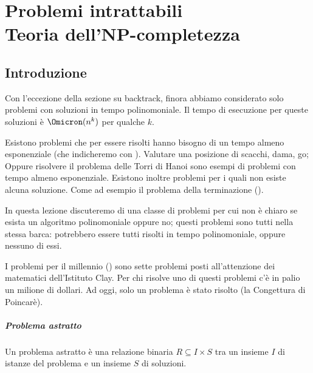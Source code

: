 
\ifsubfile
\usepackage{../settings/subfile}
\setcounter{chapter}{18}


\fi
\chapter[Problemi intrattabili e Teoria dell'NP-completezza]{Problemi intrattabili\\Teoria dell'NP-completezza}

\section*{Introduzione}

Con l'eccezione della sezione su backtrack, finora abbiamo considerato solo problemi con soluzioni in tempo polinomoniale.
Il tempo di esecuzione per queste soluzioni è \(\Omicron(n^k)\) per qualche \(k\).

Esistono problemi che per essere risolti hanno bisogno di un tempo almeno esponenziale (che indicheremo con \EXPTIME).
Valutare una posizione di scacchi, dama, go; Oppure risolvere il problema delle Torri di Hanoi sono esempi di problemi con tempo almeno esponenziale.
Esistono inoltre problemi per i quali non esiste alcuna soluzione.
Come ad esempio il problema della terminazione ().

In questa lezione discuteremo di una classe di problemi per cui non è chiaro se esista un algoritmo polinomoniale oppure no; questi problemi sono tutti nella stessa barca: potrebbero essere tutti risolti in tempo polinomoniale, oppure nessuno di essi.

I problemi per il millennio () sono sette problemi posti all'attenzione dei matematici dell'Istituto Clay.
Per chi risolve uno di questi problemi c'è in palio un milione di dollari.
Ad oggi, solo un problema è stato risolto (la Congettura di Poincarè).

\paragraph{Problema astratto}
Un problema astratto è una relazione binaria \(R \subseteq I \times S\) tra un insieme \(I\) di istanze del problema e un insieme \(S\) di soluzioni.

